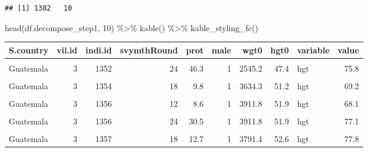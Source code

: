 \documentclass[
]{book}
\newenvironment{Shaded}{\begin{snugshade}}{\end{snugshade}}
\newcommand{\DecValTok}[1]{\textcolor[rgb]{0.00,0.00,0.81}{#1}}
\newcommand{\FunctionTok}[1]{\textcolor[rgb]{0.00,0.00,0.00}{#1}}
\newcommand{\NormalTok}[1]{#1}
\newcommand{\SpecialCharTok}[1]{\textcolor[rgb]{0.00,0.00,0.00}{#1}}
\begin{document}
\begin{verbatim}
## [1] 1382   10
\end{verbatim}

\begin{Shaded}
\begin{Highlighting}[]
\FunctionTok{head}\NormalTok{(df.decompose\_step1, }\DecValTok{10}\NormalTok{) }\SpecialCharTok{\%\textgreater{}\%}
  \FunctionTok{kable}\NormalTok{() }\SpecialCharTok{\%\textgreater{}\%}
  \FunctionTok{kable\_styling\_fc}\NormalTok{()}
\end{Highlighting}
\end{Shaded}

\begin{table}[!h]
\centering
\begin{tabular}{l|r|r|r|r|r|r|r|l|r}
\hline
S.country & vil.id & indi.id & svymthRound & prot & male & wgt0 & hgt0 & variable & value\\
\hline
\cellcolor{gray!6}{Guatemala} & \cellcolor{gray!6}{3} & \cellcolor{gray!6}{1352} & \cellcolor{gray!6}{18} & \cellcolor{gray!6}{13.3} & \cellcolor{gray!6}{1} & \cellcolor{gray!6}{2545.2} & \cellcolor{gray!6}{47.4} & \cellcolor{gray!6}{hgt} & \cellcolor{gray!6}{70.2}\\
\hline
Guatemala & 3 & 1352 & 24 & 46.3 & 1 & 2545.2 & 47.4 & hgt & 75.8\\
\hline
\cellcolor{gray!6}{Guatemala} & \cellcolor{gray!6}{3} & \cellcolor{gray!6}{1354} & \cellcolor{gray!6}{12} & \cellcolor{gray!6}{1.0} & \cellcolor{gray!6}{1} & \cellcolor{gray!6}{3634.3} & \cellcolor{gray!6}{51.2} & \cellcolor{gray!6}{hgt} & \cellcolor{gray!6}{66.3}\\
\hline
Guatemala & 3 & 1354 & 18 & 9.8 & 1 & 3634.3 & 51.2 & hgt & 69.2\\
\hline
\cellcolor{gray!6}{Guatemala} & \cellcolor{gray!6}{3} & \cellcolor{gray!6}{1354} & \cellcolor{gray!6}{24} & \cellcolor{gray!6}{15.4} & \cellcolor{gray!6}{1} & \cellcolor{gray!6}{3634.3} & \cellcolor{gray!6}{51.2} & \cellcolor{gray!6}{hgt} & \cellcolor{gray!6}{75.3}\\
\hline
Guatemala & 3 & 1356 & 12 & 8.6 & 1 & 3911.8 & 51.9 & hgt & 68.1\\
\hline
\cellcolor{gray!6}{Guatemala} & \cellcolor{gray!6}{3} & \cellcolor{gray!6}{1356} & \cellcolor{gray!6}{18} & \cellcolor{gray!6}{17.8} & \cellcolor{gray!6}{1} & \cellcolor{gray!6}{3911.8} & \cellcolor{gray!6}{51.9} & \cellcolor{gray!6}{hgt} & \cellcolor{gray!6}{74.1}\\
\hline
Guatemala & 3 & 1356 & 24 & 30.5 & 1 & 3911.8 & 51.9 & hgt & 77.1\\
\hline
\cellcolor{gray!6}{Guatemala} & \cellcolor{gray!6}{3} & \cellcolor{gray!6}{1357} & \cellcolor{gray!6}{12} & \cellcolor{gray!6}{1.0} & \cellcolor{gray!6}{1} & \cellcolor{gray!6}{3791.4} & \cellcolor{gray!6}{52.6} & \cellcolor{gray!6}{hgt} & \cellcolor{gray!6}{71.5}\\
\hline
Guatemala & 3 & 1357 & 18 & 12.7 & 1 & 3791.4 & 52.6 & hgt & 77.8\\
\hline
\end{tabular}
\end{table}
\end{document}
